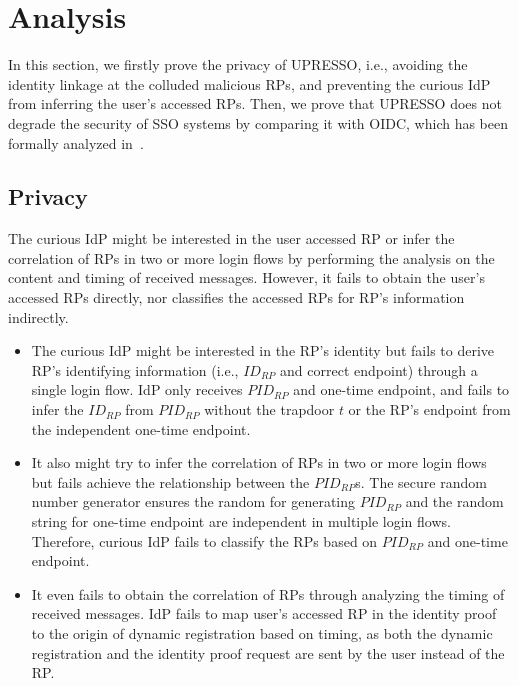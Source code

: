 \section{Analysis}
\label{sec:analysis}
In this section, we firstly prove the privacy of UPRESSO, i.e., avoiding the identity linkage at the colluded malicious RPs, 
and preventing the curious IdP from inferring the user's accessed RPs.
Then, we prove that UPRESSO does not degrade the security of SSO systems by comparing it with OIDC, which has been formally analyzed in~\cite{FettKS17}.


\subsection{Privacy}
\label{subsec:privacy}
 The curious IdP might be interested in the user accessed RP or infer the correlation of RPs in two or more login flows by performing the analysis on the content and timing of received messages. However, it fails to obtain the user's accessed RPs directly, nor classifies the accessed RPs for RP's information indirectly.
\begin{itemize}
  \item The curious IdP might be interested in the RP's identity but fails to derive RP's identifying information (i.e., $ID_{RP}$ and correct endpoint) through a single login flow. IdP only receives $PID_{RP}$ and one-time endpoint, and fails to infer the $ID_{RP}$ from $PID_{RP}$ without the  trapdoor $t$  
  or the RP's endpoint from the independent one-time endpoint.
  \item It also might try to infer the correlation of RPs in two or more login flows but fails achieve the relationship between the $PID_{RP}$s. The secure random number generator ensures the random for generating $PID_{RP}$ and the random string for one-time endpoint are independent in multiple login flows. Therefore, curious IdP fails to classify the RPs based on $PID_{RP}$ and one-time endpoint.
  \item It even fails to obtain the correlation of RPs through analyzing the timing of received messages. IdP fails to map user's accessed RP in the identity proof to the origin of dynamic registration based on {\color{red} timing, as both the dynamic registration and the identity proof request are sent by the user instead of the RP.}
\end{itemize}

